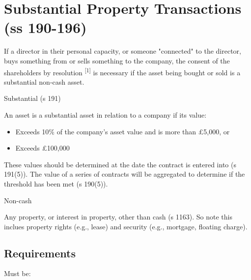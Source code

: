 \documentclass[
]{article}
\providecommand{\tightlist}{%
  \setlength{\itemsep}{0pt}\setlength{\parskip}{0pt}}
\newenvironment{env-246868e5-1b14-46c9-8aed-b83e61569202}
{
    \savenotes\tcolorbox[blanker,breakable,left=5pt,borderline west={2pt}{-4pt}{yellow}]
}
{
    \endtcolorbox\spewnotes
}
\begin{document}
\hypertarget{substantial-property-transactions-ss-190-196}{%
\section{Substantial Property Transactions (ss
190-196)}\label{substantial-property-transactions-ss-190-196}}

If a director in their personal capacity, or someone "connected" to the
director, buys something from or sells something to the company, the
consent of the shareholders by resolution \textsuperscript{{[}1{]}} is
necessary if the asset being bought or sold is a substantial non-cash
asset.

\begin{env-246868e5-1b14-46c9-8aed-b83e61569202}

Substantial (s 191)

An asset is a substantial asset in relation to a company if its value:

\begin{itemize}
\tightlist
\item
  Exceeds 10\% of the company's asset value and is more than £5,000, or
\item
  Exceeds £100,000
\end{itemize}

These values should be determined at the date the contract is entered
into (s 191(5)). The value of a series of contracts will be aggregated
to determine if the threshold has been met (s 190(5)).

\end{env-246868e5-1b14-46c9-8aed-b83e61569202}

\begin{env-246868e5-1b14-46c9-8aed-b83e61569202}

Non-cash

Any property, or interest in property, other than cash (s 1163). So note
this inclues property rights (e.g., lease) and security (e.g., mortgage,
floating charge).

\end{env-246868e5-1b14-46c9-8aed-b83e61569202}

\hypertarget{requirements}{%
\subsection{Requirements}\label{requirements}}

Must be:
\end{document}
